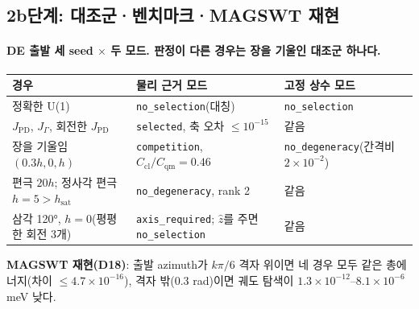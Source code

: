 \subsection{2b단계: 대조군·벤치마크·MAGSWT 재현}\label{stage2b-controls}
\begingroup%
  \framesubtitle{DE 출발 세 seed $\times$ 두 모드. 판정이 다른 경우는 장을 기울인 대조군 하나다.}
  \small
  \begin{tabularx}{\textwidth}{@{}YP{2.9cm}P{2.9cm}@{}}
    \toprule
    경우 & 물리 근거 모드 & 고정 상수 모드 \\
    \midrule
    정확한 U(1) & \texttt{no\_selection}(대칭) & \texttt{no\_selection} \\
    $J_{\mathrm{PD}}$, $J_\Gamma$, 회전한 $J_{\mathrm{PD}}$ & \texttt{selected}, 축 오차 $\le10^{-15}$ & 같음 \\
    장을 기울임 $(0.3h,0,h)$ & \texttt{competition}, $C_{\mathrm{cl}}/C_{\mathrm{qm}}=0.46$ & \texttt{no\_degeneracy}(간격비 $2\times10^{-2}$) \\
    편극 $20h$; 정사각 편극 $h=5>h_{\mathrm{sat}}$ & \texttt{no\_degeneracy}, rank 2 & 같음 \\
    삼각 120°, $h=0$(평평한 회전 3개) & \texttt{axis\_required}; $\hat z$를 주면 \texttt{no\_selection} & 같음 \\
    \bottomrule
  \end{tabularx}
  \par\smallskip
  \textbf{MAGSWT 재현(D18)}: 출발 azimuth가 $k\pi/6$ 격자 위이면 네 경우 모두 같은 총에너지(차이 $\le4.7\times10^{-16}$),
  격자 밖(0.3 rad)이면 궤도 탐색이 $1.3\times10^{-12}$--$8.1\times10^{-6}$ meV 낮다.
  \par\smallskip
\endgroup


